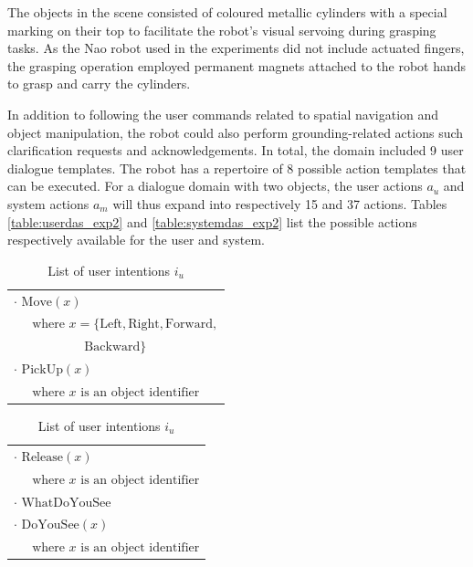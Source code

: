 The objects in the scene consisted of coloured metallic cylinders with a special marking on their top to facilitate the robot's visual servoing during grasping tasks.  As the Nao robot used in the experiments did not include actuated fingers, the grasping operation employed permanent magnets attached to the robot hands to grasp and carry the cylinders.

In addition to following the user commands related to spatial navigation and object manipulation, the robot could also perform grounding-related actions such clarification requests and acknowledgements. In total, the domain included 9 user dialogue templates.  The robot has a repertoire of 8 possible action templates that can be executed.  For a dialogue domain with two objects, the user actions $a_u$ and system actions $a_m$ will thus expand into respectively 15 and 37 actions.  Tables \ref{table:userdas_exp2} and \ref{table:systemdas_exp2} list the possible actions respectively available for the user and system.

\renewcommand{\arraystretch}{1.3}

\begin{table}[p]
\begin{footnotesize}
\begin{tabular}{p{60mm}} 
$\cdot$ $\mathrm{Move}(x) $ \\ $ \ \ \ \ \ \text{ where } x=\{\mathrm{Left,Right,Forward,}$ \\ $\ \ \ \ \ \ \ \ \ \ \ \ \ \ \ \ \ \ \ \ \ \ \ \ \ \mathrm{Backward}\} $ \\ 
$\cdot$ $\mathrm{PickUp}(x) $ \\ $\ \ \ \ \  \text{ where } x \text{ is an object identifier}$ 
\end{tabular}
\hspace{2cm}
\begin{tabular}{p{60mm}} 
$\cdot$ $\mathrm{Release}(x) $ \\ $\ \ \ \ \  \text{ where } x \text{ is an object identifier}$ \\
$\cdot$ $\mathrm{WhatDoYouSee}$ \\
$\cdot$ $\mathrm{DoYouSee}(x) $ \\ $\ \ \ \ \  \text{ where } x \text{ is an object identifier}$ 
\end{tabular}
\end{footnotesize}
 \caption{List of user intentions $i_u$} 
\label{table:userintents_exp2}
\end{table}


